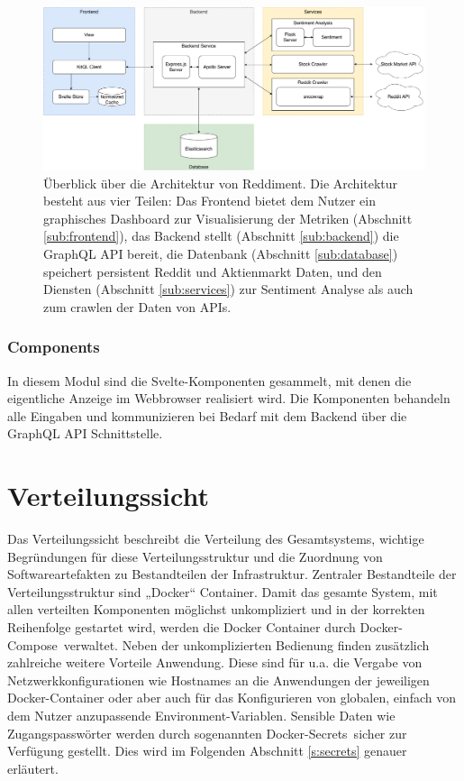 \documentclass[a4paper, 10pt, conference]{IEEEtran}
\begin{document}
\begin{figure}[ht]
	\centering
	\includegraphics[width=\linewidth]{architecture}
	\caption{Überblick über die Architektur von Reddiment. Die Architektur besteht aus vier Teilen: Das Frontend bietet dem Nutzer ein graphisches Dashboard zur Visualisierung der Metriken (Abschnitt \ref{sub:frontend}),  das Backend stellt (Abschnitt \ref{sub:backend}) die GraphQL API bereit,  die Datenbank (Abschnitt \ref{sub:database}) speichert persistent Reddit und Aktienmarkt Daten,  und den Diensten (Abschnitt \ref{sub:services}) zur Sentiment Analyse als auch zum crawlen der Daten von APIs.}
	\label{fig:architecture}
\end{figure}

\subsubsection{Components}

In diesem Modul sind die Svelte-Komponenten gesammelt, mit denen die eigentliche Anzeige im Webbrowser realisiert wird.
Die Komponenten behandeln alle Eingaben und kommunizieren bei Bedarf mit dem Backend über die GraphQL API Schnittstelle.



\section{Verteilungssicht} \label{s:verteilungssicht}
Das Verteilungssicht beschreibt die Verteilung des Gesamtsystems, wichtige Begründungen für diese Verteilungsstruktur und die Zuordnung von Softwareartefakten zu Bestandteilen der Infrastruktur.
Zentraler Bestandteile der Verteilungsstruktur sind „Docker“ \cite{docker} Container.
Damit das gesamte System, mit allen verteilten Komponenten möglichst unkompliziert und in der korrekten Reihenfolge gestartet wird, werden die Docker Container durch \glqq Docker-Compose\grqq \ verwaltet. Neben der unkomplizierten Bedienung finden zusätzlich zahlreiche weitere Vorteile Anwendung.
Diese sind für u.a. die Vergabe von Netzwerkkonfigurationen wie Hostnames an die Anwendungen der jeweiligen Docker-Container oder aber auch für das Konfigurieren von globalen, einfach von dem Nutzer anzupassende Environment-Variablen. Sensible Daten wie Zugangspasswörter werden durch sogenannten \glqq Docker-Secrets\grqq \ sicher zur Verfügung gestellt.
Dies wird im Folgenden Abschnitt \ref{s:secrets} genauer erläutert.
\end{document}
